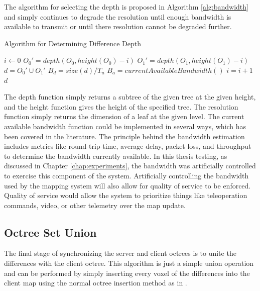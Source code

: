 \documentclass[12pt]{report}
\begin{document}
The algorithm for selecting the depth is proposed in Algorithm \ref{alg:bandwidth} and simply continues to degrade the resolution until enough bandwidth is available to transmit or until there resolution cannot be degraded further.

\begin{algorithm}
\caption{Algorithm for Determining Difference Depth}
\label{alg:bandwidth}
\begin{algorithmic}
  \STATE {}
  \STATE {}
  \STATE {}
  \STATE {}
  \STATE {}
  \STATE {}
  \STATE {}
  \STATE $i\gets 0$
  \REPEAT
    \STATE $O_0 \prime = depth(O_0,height(O_0)-i)$
    \STATE $O_1 \prime = depth(O_1,height(O_1)-i)$
    \STATE $d = O_0 \prime \cup O_1 \prime $
    \STATE $B_d = size(d) / T_u$
    \STATE $B_a = currentAvailableBandwidth()$
    \STATE $i = i + 1$
  \RETURN $d$
\end{algorithmic}
\end{algorithm}

The depth function simply returns a subtree of the given tree at the given height, and the height function gives the height of the specified tree.  The resolution function simply returns the dimension of a leaf at the given level.  The current available bandwidth function could be implemented in several ways, which has been covered in the literature\cite{prasad2003bandwidth}. The principle behind the bandwidth estimation includes metrics like round-trip-time, average delay, packet loss, and throughput to determine the bandwidth currently available.  In this thesis testing, as discussed in Chapter \ref{chap:experiments}, the bandwidth was artificially controlled to exercise this component of the system.  Artificially controlling the bandwidth used by the mapping system will also allow for quality of service to be enforced.  Quality of service would allow the system to prioritize things like teleoperation commands, video, or other telemetry over the map update.

\subsection{Octree Set Union}
The final stage of synchronizing the server and client octrees is to unite the differences with the client octree. This algorithm is just a simple union operation and can be performed by simply inserting every voxel of the differences into the client map using the normal octree insertion method as in \cite{meagher1982geometric}.
\end{document}
